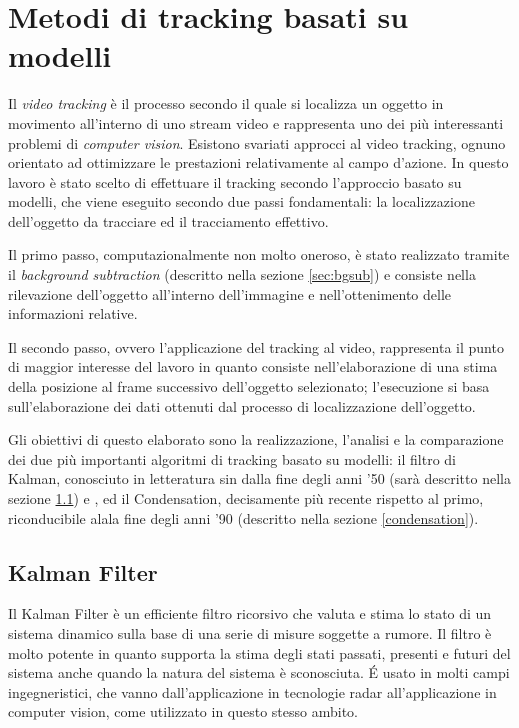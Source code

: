 \section{Metodi di tracking basati su modelli} \label{modelTracking}
Il \textit{video tracking} è il processo secondo il quale si localizza un oggetto in movimento all'interno di uno stream video e rappresenta uno dei più interessanti problemi di \textit{computer vision}. Esistono svariati approcci al video tracking, ognuno orientato ad ottimizzare le prestazioni relativamente al campo d'azione. In questo lavoro è stato scelto di effettuare il tracking secondo l'approccio basato su modelli, che viene eseguito secondo due passi fondamentali: la localizzazione dell'oggetto da tracciare ed il tracciamento effettivo.

Il primo passo, computazionalmente non molto oneroso, è stato realizzato tramite il \textit{background subtraction} (descritto nella sezione \ref{sec:bgsub}) e consiste nella rilevazione dell'oggetto all'interno dell'immagine e nell'ottenimento delle informazioni relative.

Il secondo passo, ovvero l'applicazione del tracking al video, rappresenta il punto di maggior interesse del lavoro in quanto consiste nell'elaborazione di una stima della posizione al frame successivo dell'oggetto selezionato; l'esecuzione si basa sull'elaborazione dei dati ottenuti dal processo di localizzazione dell'oggetto.

Gli obiettivi di questo elaborato sono la realizzazione, l'analisi e la comparazione dei due più importanti algoritmi di tracking basato su modelli: il filtro di Kalman, conosciuto in letteratura sin dalla fine degli anni '50 (sarà descritto nella sezione \ref{kalman}) e , ed il Condensation, decisamente più recente rispetto al primo, riconducibile alala fine degli anni '90 (descritto nella sezione \ref{condensation}).


\subsection{Kalman Filter}\label{kalman}
Il Kalman Filter\cite{kalman-intro} è un efficiente filtro ricorsivo che valuta e stima lo stato di un sistema dinamico sulla base di una serie di misure soggette a rumore. Il filtro è molto potente in quanto supporta la stima degli stati passati, presenti e futuri del sistema anche quando la natura del sistema è sconosciuta. \'E usato in molti campi ingegneristici, che vanno dall'applicazione in tecnologie radar all'applicazione in computer vision, come utilizzato in questo stesso ambito.
